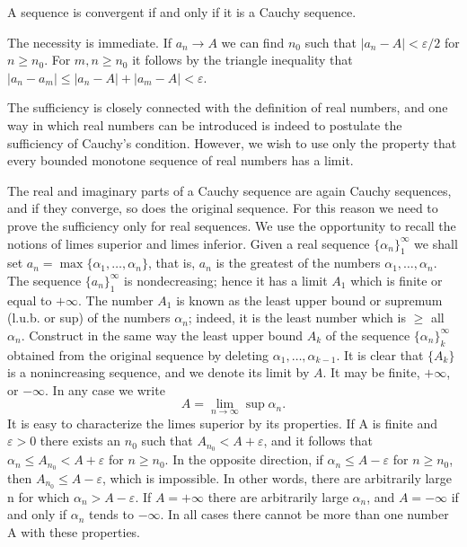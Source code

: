A sequence is convergent if and only if it is a Cauchy sequence.

The necessity is immediate. If $a_{n} \rightarrow A$ we can find $n_{0}$ such that $|a_{n} - A| < \varepsilon/2$ for $n \geq n_{0}$. For $m, n \geq n_{0}$ it follows by the triangle inequality that $|a_{n} - a_{m}| \leq |a_{n} - A| + |a_{m} - A| < \varepsilon$.

The sufficiency is closely connected with the definition of real numbers, and one way in which real numbers can be introduced is indeed to postulate the sufficiency of Cauchy's condition. However, we wish to use only the property that every bounded monotone sequence of real numbers has a limit.


The real and imaginary parts of a Cauchy sequence are again Cauchy sequences, and if they converge, so does the original sequence. For this reason we need to prove the sufficiency only for real sequences. We use the opportunity to recall the notions of limes superior and limes inferior. Given a real sequence $\{\alpha_n\}_1^\infty$ we shall set $a_n = \max \{\alpha_1, \ldots, \alpha_n\}$, that is, $a_n$ is the greatest of the numbers $\alpha_1, \ldots, \alpha_n$. The sequence $\{a_n\}_1^\infty$ is nondecreasing; hence it has a limit $A_1$ which is finite or equal to $+\infty$. The number $A_1$ is known as the least upper bound or supremum (l.u.b. or sup) of the numbers $\alpha_n$; indeed, it is the least number which is $\geq$ all $\alpha_n$. Construct in the same way the least upper bound $A_k$ of the sequence $\{\alpha_n\}_k^\infty$ obtained from the original sequence by deleting $\alpha_1, \ldots, \alpha_{k-1}$. It is clear that $\{A_k\}$ is a nonincreasing sequence, and we denote its limit by $A$. It may be finite, $+\infty$, or $-\infty$. In any case we write
\begin{equation*}
A = \lim _ {n \rightarrow \infty} \sup \alpha_ {n}.
\end{equation*}
It is easy to characterize the limes superior by its properties. If A is finite and $\varepsilon > 0$ there exists an $n_{0}$ such that $A_{n_{0}} < A + \varepsilon$, and it follows that $\alpha_{n} \leq A_{n_{0}} < A + \varepsilon$ for $n \geq n_{0}$. In the opposite direction, if $\alpha_{n} \leq A - \varepsilon$ for $n \geq n_{0}$, then $A_{n_{0}} \leq A - \varepsilon$, which is impossible. In other words, there are arbitrarily large n for which $\alpha_{n} > A - \varepsilon$. If $A = +\infty$ there are arbitrarily large $\alpha_{n}$, and $A = -\infty$ if and only if $\alpha_{n}$ tends to $-\infty$. In all cases there cannot be more than one number A with these properties.

